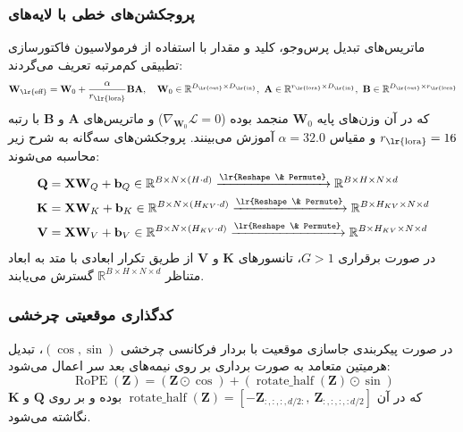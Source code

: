 \subsubsection*{پروجکشن‌های خطی با لایه‌های }
ماتریس‌های تبدیل پرس‌وجو، کلید و مقدار با استفاده از فرمولاسیون فاکتورسازی تطبیقی کم‌مرتبه تعریف می‌گردند:
\begin{equation}
\mathbf{W}_{\text{\lr{eff}}} = \mathbf{W}_0 + \frac{\alpha}{r_{\text{\lr{lora}}}} \mathbf{B} \mathbf{A}, \quad \mathbf{W}_0 \in \mathbb{R}^{D_{\text{\lr{out}}} \times D_{\text{\lr{in}}}}, \ \mathbf{A} \in \mathbb{R}^{r_{\text{\lr{lora}}} \times D_{\text{\lr{in}}}}, \ \mathbf{B} \in \mathbb{R}^{D_{\text{\lr{out}}} \times r_{\text{\lr{lora}}}}
\end{equation}
که در آن وزن‌های پایه $\mathbf{W}_0$ منجمد بوده ($\nabla_{\mathbf{W}_0} \mathcal{L} = 0$) و ماتریس‌های $\mathbf{A}$ و $\mathbf{B}$ با رتبه $r_{\text{\lr{lora}}} = 16$ و مقیاس $\alpha = 32.0$ آموزش می‌بینند. پروجکشن‌های سه‌گانه به شرح زیر محاسبه می‌شوند:
\begin{align}
\mathbf{Q} &= \mathbf{X} \mathbf{W}_Q + \mathbf{b}_Q \in \mathbb{R}^{B \times N \times (H \cdot d)} \xrightarrow{\text{\lr{Reshape \& Permute}}} \mathbb{R}^{B \times H \times N \times d} \\
\mathbf{K} &= \mathbf{X} \mathbf{W}_K + \mathbf{b}_K \in \mathbb{R}^{B \times N \times (H_{KV} \cdot d)} \xrightarrow{\text{\lr{Reshape \& Permute}}} \mathbb{R}^{B \times H_{KV} \times N \times d} \\
\mathbf{V} &= \mathbf{X} \mathbf{W}_V + \mathbf{b}_V \in \mathbb{R}^{B \times N \times (H_{KV} \cdot d)} \xrightarrow{\text{\lr{Reshape \& Permute}}} \mathbb{R}^{B \times H_{KV} \times N \times d}
\end{align}
در صورت برقراری $G > 1$، تانسورهای $\mathbf{K}$ و $\mathbf{V}$ از طریق تکرار ابعادی با متد  به ابعاد متناظر $\mathbb{R}^{B \times H \times N \times d}$ گسترش می‌یابند.

\subsubsection*{کدگذاری موقعیتی چرخشی }
در صورت پیکربندی جاسازی موقعیت با بردار فرکانسی چرخشی $(\cos, \sin)$، تبدیل هرمیتین متعامد به صورت برداری بر روی نیمه‌های بعد سر اعمال می‌شود:
\begin{equation}
\operatorname{RoPE}(\mathbf{Z}) = (\mathbf{Z} \odot \cos) + (\operatorname{rotate\_half}(\mathbf{Z}) \odot \sin)
\end{equation}
که در آن $\operatorname{rotate\_half}(\mathbf{Z}) = [-\mathbf{Z}_{:, :, :, d/2:}, \ \mathbf{Z}_{:, :, :, :d/2}]$ بوده و بر روی $\mathbf{Q}$ و $\mathbf{K}$ نگاشته می‌شود.

